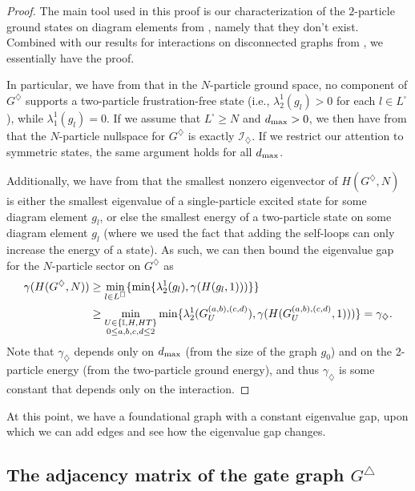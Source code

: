 \documentclass[../thesis-main/thesis-main]{subfiles}
\begin{document}
\begin{proof}
The main tool used in this proof is our characterization of the $2$-particle ground states on diagram elements from , namely that they don't exist.  Combined with our results for interactions on disconnected graphs from , we essentially have the proof.  

In particular, we have from  that in the $N$-particle ground space, no component of $G^{\diamondsuit}$ supports a two-particle frustration-free state (i.e., $\lambda_{2}^1(g_l)>0$ for each $l\in L^\square$), while $\lambda_1^1(g_l) = 0$.  If we assume that $L^\square \geq N$ and $d_{\text{max}} > 0$, we then have from  that the $N$-particle nullspace for $G^{\diamondsuit}$ is exactly $\mathcal{I}_\diamondsuit$.  If we restrict our attention to symmetric states, the same argument holds for all $d_{\text{max}}$.

Additionally, we have from  that the smallest nonzero eigenvector of $H(G^\diamondsuit,N)$ is either the smallest eigenvalue of a single-particle excited state for some diagram element $g_l$, or else the smallest energy of a two-particle state on some diagram element $g_l$ (where we used the fact that adding the self-loops can only increase the energy of a state).  As such, we can then bound the eigenvalue gap for the $N$-particle sector on $G^\diamondsuit$ as
\begin{align}
  \gamma(H(G^{\diamondsuit},N))&\geq \min_{l\in L^{\square}}\{ \min\{\lambda_{2}^{1}(g_{l}),\gamma(H(g_{l},1)))\}\} \\
    &\geq \min_{\substack{U\in\{\mathbb{I},H,HT\}\\0\leq a,b,c,d \leq 2}} \min\{\lambda_{2}^{1}(G_U^{(a,b),(c,d)}),\gamma(H(G_U^{(a,b),(c,d)},1)))\} =\gamma_{\diamondsuit}.
\end{align}
Note that $\gamma_{\diamondsuit}$ depends only on $d_{\text{max}}$ (from the size of the graph $g_0$) and on the 2-particle energy (from the two-particle ground energy), and thus $\gamma_\diamondsuit$ is some constant that depends only on the interaction.
\end{proof}

At this point, we have a foundational graph with a constant eigenvalue gap, upon which we can add edges and see how the eigenvalue gap changes.

\subsection{The adjacency matrix of the gate graph $G^{\triangle}$}
\label{sec:The-gate-graph_G_triangle}
\end{document}
